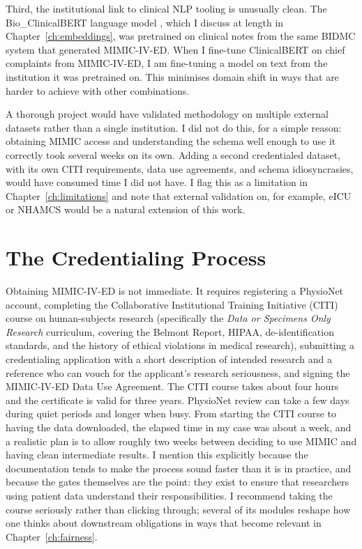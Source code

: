 Third, the institutional link to clinical NLP tooling is unusually clean. The Bio\_ClinicalBERT language model \citep{alsentzer2019clinicalbert}, which I discuss at length in Chapter~\ref{ch:embeddings}, was pretrained on clinical notes from the same BIDMC system that generated MIMIC-IV-ED. When I fine-tune ClinicalBERT on chief complaints from MIMIC-IV-ED, I am fine-tuning a model on text from the institution it was pretrained on. This minimises domain shift in ways that are harder to achieve with other combinations.

\begin{notebox}
A thorough project would have validated methodology on multiple external datasets rather than a single institution. I did not do this, for a simple reason: obtaining MIMIC access and understanding the schema well enough to use it correctly took several weeks on its own. Adding a second credentialed dataset, with its own CITI requirements, data use agreements, and schema idiosyncrasies, would have consumed time I did not have. I flag this as a limitation in Chapter~\ref{ch:limitations} and note that external validation on, for example, eICU or NHAMCS would be a natural extension of this work.
\end{notebox}

\section{The Credentialing Process}

Obtaining MIMIC-IV-ED is not immediate. It requires registering a PhysioNet account, completing the Collaborative Institutional Training Initiative (CITI) course on human-subjects research (specifically the \emph{Data or Specimens Only Research} curriculum, covering the Belmont Report, HIPAA, de-identification standards, and the history of ethical violations in medical research), submitting a credentialing application with a short description of intended research and a reference who can vouch for the applicant's research seriousness, and signing the MIMIC-IV-ED Data Use Agreement. The CITI course takes about four hours and the certificate is valid for three years. PhysioNet review can take a few days during quiet periods and longer when busy. From starting the CITI course to having the data downloaded, the elapsed time in my case was about a week, and a realistic plan is to allow roughly two weeks between deciding to use MIMIC and having clean intermediate results. I mention this explicitly because the documentation tends to make the process sound faster than it is in practice, and because the gates themselves are the point: they exist to ensure that researchers using patient data understand their responsibilities. I recommend taking the course seriously rather than clicking through; several of its modules reshape how one thinks about downstream obligations in ways that become relevant in Chapter~\ref{ch:fairness}.

